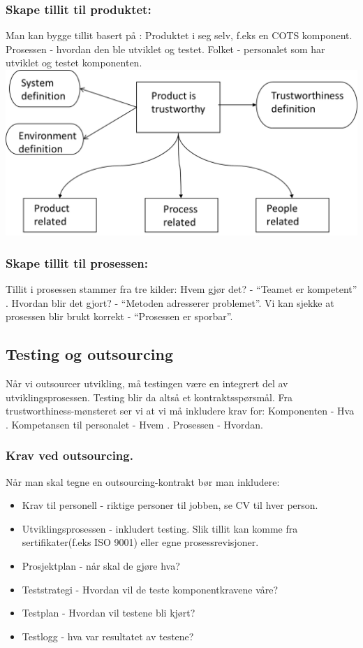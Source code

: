 \subsubsection{Skape tillit til produktet:}

Man kan bygge tillit basert på : Produktet i seg selv, f.eks en COTS
komponent. Prosessen - hvordan den ble utviklet og testet. Folket -
personalet som har utviklet og testet komponenten.
\includegraphics{Forelesning 09/img/2.png}

\subsubsection{Skape tillit til prosessen:}

Tillit i prosessen stammer fra tre kilder: Hvem gjør det? - ``Teamet er
kompetent'' . Hvordan blir det gjort? - ``Metoden adresserer
problemet''. Vi kan sjekke at prosessen blir brukt korrekt - ``Prosessen
er sporbar''.

\subsection{Testing og outsourcing}

Når vi outsourcer utvikling, må testingen være en integrert del av
utviklingsprosessen. Testing blir da altså et kontraktsspørsmål. Fra
trustworthiness-mønsteret ser vi at vi må inkludere krav for:
Komponenten - Hva . Kompetansen til personalet - Hvem . Prosessen -
Hvordan.

\subsubsection{Krav ved outsourcing.}

Når man skal tegne en outsourcing-kontrakt bør man inkludere:

\begin{itemize}
\item
  Krav til personell - riktige personer til jobben, se CV til hver
  person.
\item
  Utviklingsprosessen - inkludert testing. Slik tillit kan komme fra
  sertifikater(f.eks ISO 9001) eller egne prosessrevisjoner.
\item
  Prosjektplan - når skal de gjøre hva?
\item
  Teststrategi - Hvordan vil de teste komponentkravene våre?
\item
  Testplan - Hvordan vil testene bli kjørt?
\item
  Testlogg - hva var resultatet av testene?
\end{itemize}
